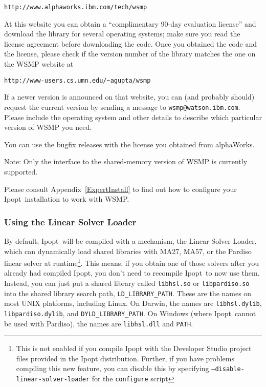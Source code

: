 \documentclass[10pt]{article}
\newcommand{\Ipopt}{{\sc Ipopt}}
\begin{document}
\texttt{http://www.alphaworks.ibm.com/tech/wsmp}

At this website you can obtain a ``complimentary 90-day evaluation
license'' and download the library for several operating systems; make
sure you read the license agreement before downloading the code.  Once
you obtained the code and the license, please check if the version
number of the library matches the one on the WSMP website at

{\tt http://www-users.cs.umn.edu/\verb|~|agupta/wsmp}

If a newer version is announced on that website, you can (and
probably should) request the current version by sending a message to
\verb|wsmp@watson.ibm.com|.  Please include the operating system and
other details to describe which particular version of WSMP you need.

You can use the bugfix releases with the license you obtained from
alphaWorks.

Note: Only the interface to the shared-memory version of WSMP is
currently supported.

Please consult Appendix~\ref{ExpertInstall} to find out how to
configure your \Ipopt\ installation to work with WSMP.

\subsubsection{Using the Linear Solver  Loader}\label{sec:linear_solver_loader}
By default, \Ipopt\ will be compiled with a mechanism, the Linear
Solver Loader, which can dynamically load shared libraries with MA27,
MA57, or the Pardiso linear solver at runtime\footnote{This is not
  enabled if you compile Ipopt with the Developer Studio project files
  provided in the Ipopt distribution.  Further, if you have problems
  compiling this new feature, you can disable this by specifying
  \texttt{--disable-linear-solver-loader} for the \texttt{configure}
  script}. This means, if you obtain one of those solvers after you
already had compiled \Ipopt, you don't need to recompile \Ipopt\ to
now use them.  Instead, you can just put a shared library called
\texttt{libhsl.so} or \texttt{libpardiso.so} into the shared library
search path, \texttt{LD\_LIBRARY\_PATH}.  These are the names on most
UNIX platforms, including Linux.  On Darwin, the names are
\texttt{libhsl.dylib}, \texttt{libpardiso.dylib}, and
\texttt{DYLD\_LIBRARY\_PATH}.  On Windows (where \Ipopt\ cannot be
used with Pardiso), the names are \texttt{libhsl.dll} and \texttt{PATH}.
\end{document}
